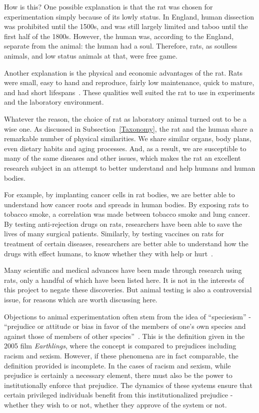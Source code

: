 \documentclass[12pt]{article}
\begin{document}
How is this? One possible explanation is that the rat was chosen for experimentation simply because of its lowly status. In England, human dissection was prohibited until the 1500s, and was still largely limited and taboo until the first half of the 1800s. However, the human was, according to the England, separate from the animal: the human had a soul. Therefore, rats, as soulless animals, and low status animals at that, were free game.

Another explanation is the physical and economic advantages of the rat. Rats were small, easy to hand and reproduce, fairly low maintenance, quick to mature, and had short lifespans~\cite{Edelman2002}. These qualities well suited the rat to use in experiments and the laboratory environment.

Whatever the reason, the choice of rat as laboratory animal turned out to be a wise one. As discussed in Subsection~\ref{Taxonomy}, the rat and the human share a remarkable number of physical similarities. We share similar organs, body plans, even dietary habits and aging processes. And, as a result, we are susceptible to many of the same diseases and other issues, which makes the rat an excellent research subject in an attempt to better understand and help humans and human bodies.

For example, by implanting cancer cells in rat bodies, we are better able to understand how cancer roots and spreads in human bodies. By exposing rats to tobacco smoke, a correlation was made between tobacco smoke and lung cancer. By testing anti-rejection drugs on rats, researchers have been able to save the lives of many surgical patients. Similarly, by testing vaccines on rats for treatment of certain diseases, researchers are better able to understand how the drugs with effect humans, to know whether they with help or hurt~\cite{Marrin2006}.

Many scientific and medical advances have been made through research using rats, only a handful of which have been listed here. It is not in the interests of this project to negate these discoveries. But animal testing is also a controversial issue, for reasons which are worth discussing here.

Objections to animal experimentation often stem from the idea of ``speciesism'' - ``prejudice or attitude or bias in favor of the members of one's own species and against those of members of other species''~\cite{Phoenix2005}. This is the definition given in the 2005 film \textit{Earthlings}, where the concept is compared to prejudices including racism and sexism. However, if these phenomena are in fact comparable, the definition provided is incomplete. In the cases of racism and sexism, while prejudice is certainly a necessary element, there must also be the power to institutionally enforce that prejudice. The dynamics of these systems ensure that certain privileged individuals benefit from this institutionalized prejudice - whether they wish to or not, whether they approve of the system or not.
\end{document}
